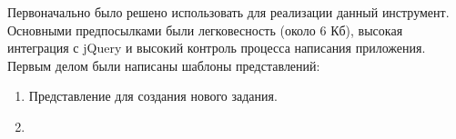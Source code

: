 Первоначально было решено использовать для реализации данный инструмент. Основными предпосылками были легковесность (около 6 Кб), высокая интеграция с jQuery и высокий контроль процесса написания приложения. Первым делом были написаны шаблоны представлений:
\begin{enumerate}
 \item Представление для создания нового задания. 
 \item 
\end{enumerate}
